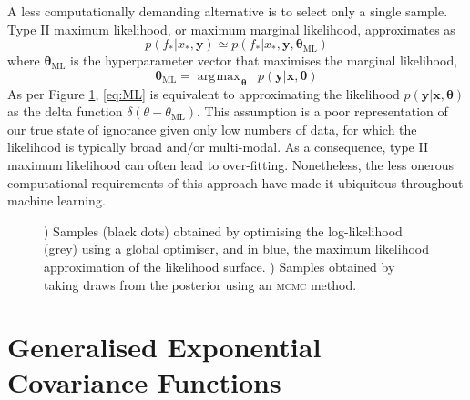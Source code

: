 \documentclass{article}
\newcommand{\vect}[1]{\mathbf{#1}}
\newcommand{\xd}{\vect{x}}
\newcommand{\yd}{\vect{y}}
\DeclareMathOperator*{\argmax}{\arg\!\max\!}
\begin{document}
A less computationally demanding alternative is to select only a single sample. Type II maximum likelihood, or maximum marginal likelihood, approximates as
\begin{equation} \label{eq:ML}
p(f_* |x_*, \yd) \simeq p(f_* | x_*, \yd,\bm{\theta}_{\mathrm{ML}})
\end{equation}
where $\bm{\theta}_{\mathrm{ML}}$ is the hyperparameter vector that maximises the marginal likelihood, 
\begin{equation}
\bm{\theta}_{\mathrm{ML}} = \argmax_{\bm{\theta}} \;\; p(\yd|\xd,\bm{\theta})
\end{equation}
As per Figure \ref{fig:ML}, \eqref{eq:ML} is equivalent to approximating the likelihood $p(\yd|\xd,\bm{\theta})$ as the delta function $\delta(\theta - \theta_{\mathrm{ML}})$. This assumption is a poor representation of our true state of ignorance given only low numbers of data, for which the likelihood is typically broad and/or multi-modal. As a consequence, type II maximum likelihood can often lead to over-fitting. Nonetheless, the less onerous computational requirements of this approach have made it ubiquitous throughout machine learning. 

\begin{figure}
	\begin{subfigure}[b]{7cm}
	  \caption{}
	  \label{fig:ML}
	\end{subfigure}
	\begin{subfigure}[b]{7cm}
	  \caption{}
	  \label{fig:MCMC}
	\end{subfigure}
\caption{) Samples (black dots) obtained by optimising the log-likelihood (grey) using a global optimiser, and in blue, the maximum likelihood approximation of the likelihood surface. ) Samples obtained by taking draws from the posterior using an {\scshape mcmc} method.}
\label{fig:periodic_likelihood}
\end{figure}

\section{Generalised Exponential Covariance Functions} 
 
\end{document}
